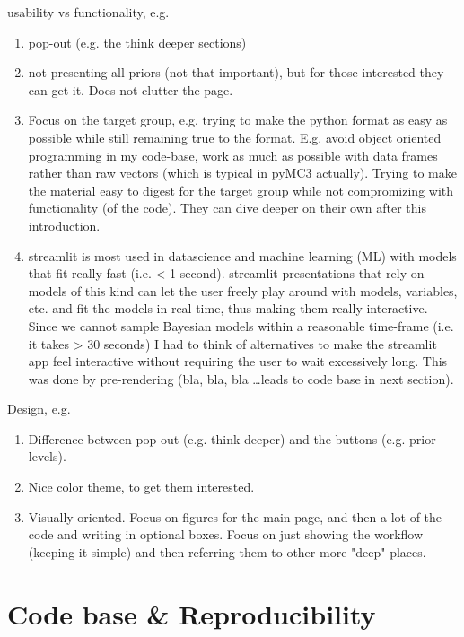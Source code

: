 \documentclass[12pt]{article}
\begin{document}
usability vs functionality, e.g.
\begin{enumerate}
	\item pop-out (e.g. the think deeper sections) \\
	\item not presenting all priors (not that important), but for those
		interested they can get it. Does not clutter the page. \\
	\item Focus on the target group, e.g. trying to make the python format
		as easy as possible while still remaining true to the format.
		E.g. avoid object oriented programming in my code-base,
		work as much as possible with data frames rather than raw
		vectors (which is typical in pyMC3 actually). Trying to make
		the material easy to digest for the target group while not
		compromizing with functionality (of the code). They can dive
		deeper on their own after this introduction. \\
	\item streamlit is most used in datascience and machine learning (ML)
		with models that fit really fast (i.e. < 1 second). streamlit
		presentations that rely on models of this kind can let the user
		freely play around with models, variables, etc. and fit the
		models in real time, thus making them really interactive.
		Since we cannot sample Bayesian models within a reasonable time-frame
		(i.e. it takes > 30 seconds) I had to think of alternatives
		to make the streamlit app feel interactive without requiring
		the user to wait excessively long. This was done by
		pre-rendering (bla, bla, bla \ldots leads to code base in next
		section).
\end{enumerate}

Design, e.g.
\begin{enumerate}
	\item Difference between pop-out (e.g. think deeper) and
		the buttons (e.g. prior levels). \\
	\item Nice color theme, to get them interested. \\
	\item Visually oriented. Focus on figures for the main page,
		and then a lot of the code and writing in optional boxes.
		Focus on just showing the workflow (keeping it simple) and
		then referring them to other more "deep" places. \\
\end{enumerate}

\section{Code base \& Reproducibility}
\end{document}
